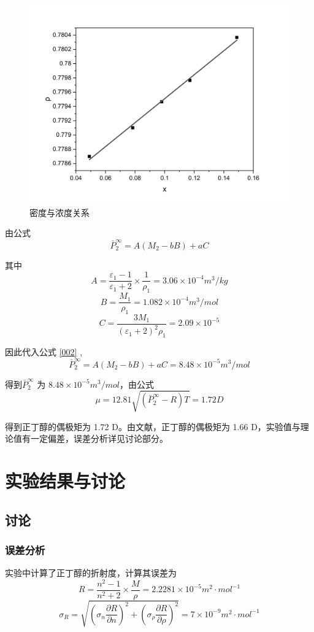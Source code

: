\documentclass[cn,hazy,pku,12pt,normal,math=newtx,cite=super]{elegantnote}
\begin{document}
\begin{figure}[htbp]
    \centering
    \includegraphics[width = .70\textwidth]{image/Graph3.png}
    \caption{密度与浓度关系}\label{4}
\end{figure}


由公式
\begin{equation}\label{002}
    \bar{P}_2^\infty = A (M_2 - b B) + a C
\end{equation}

其中
$$
A = \frac{\varepsilon_1 - 1}{\varepsilon_1 + 2}\times\frac{1}{\rho_1} = 3.06 \times 10^{-4} m^3/kg
$$
$$
B = \frac{M_1}{\rho_1} =  1.082 \times 10^{-4} m^3/mol
$$
$$
C = \frac{3M_1}{(\varepsilon_1 + 2)^2\rho_1} = 2.09 \times 10^{-5}
$$

因此代入公式 \ref{002} ,
$$
\bar{P}_2^\infty = A (M_2 - b B) + a C = 8.48 \times 10^{-5}m^3/mol
$$

得到$\bar{P}_2^\infty$ 为 $8.48 \times 10^{-5}m^3/mol$，由公式
\begin{equation}\label{003}
    \mu = 12.81\sqrt{(\bar{P}_2^\infty - R)T} = 1.72 D
\end{equation}

得到正丁醇的偶极矩为 1.72 D。由文献\cite{CRC}，正丁醇的偶极矩为 1.66 D，实验值与理论值有一定偏差，误差分析详见讨论部分。

\section{实验结果与讨论}
\subsection{讨论}
\subsubsection{误差分析}
实验中计算了正丁醇的折射度，计算其误差为
$$
R = \frac{n^2-1}{n^2+2}\times\frac{M}{\rho} = 2.2281 \times 10^{-5} m^2\cdot mol^{-1}
$$
$$
\sigma_R = \sqrt{(\sigma_n \frac{\partial R}{\partial n})^2+(\sigma_\rho \frac{\partial R}{\partial \rho})^2} = 7 \times 10^{-9} m^2\cdot mol^{-1}
$$
\end{document}
